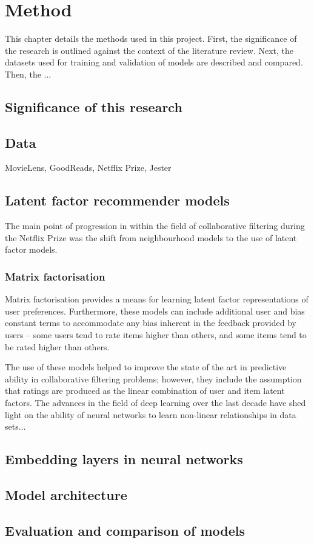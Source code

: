 \chapter{Method}
This chapter details the methods used in this project. First, the significance of the research is outlined against the context of the literature review. Next, the datasets used for training and validation of models are described and compared. Then, the ...

\section{Significance of this research}

\section{Data}
MovieLens, GoodReads, Netflix Prize, Jester

\section{Latent factor recommender models}
The main point of progression in within the field of collaborative filtering during the Netflix Prize was the shift from neighbourhood models to the use of latent factor models.

\subsection{Matrix factorisation}
Matrix factorisation provides a means for learning latent factor representations of user preferences. Furthermore, these models can include additional user and bias constant terms to accommodate any bias inherent in the feedback provided by users -- some users tend to rate items higher than others, and some items tend to be rated higher than others.

The use of these models helped to improve the state of the art in predictive ability in collaborative filtering problems; however, they include the assumption that ratings are produced as the linear combination of user and item latent factors. The advances in the field of deep learning over the last decade have shed light on the ability of neural networks to learn non-linear relationships in data sets...

\section{Embedding layers in neural networks}

\section{Model architecture}

\section{Evaluation and comparison of models}
